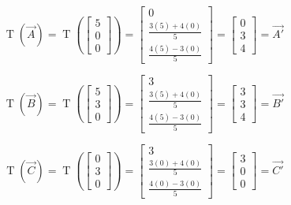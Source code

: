 \documentclass[12pt, letterpaper]{article}
\theoremstyle{statement}
\theoremstyle{statement}
\begin{document}
    $$
    \operatorname{T}(\Vec{A})
    =\operatorname{T}\left(\begin{bmatrix}
                        5\\ 0\\ 0
                        \end{bmatrix}\right)
    =\begin{bmatrix}
    0\\
    \frac{3(5)+4(0)}{5}\\
    \frac{4(5)-3(0)}{5}
    \end{bmatrix}
    =\begin{bmatrix}
    0\\
    3\\
    4
    \end{bmatrix}
    =\Vec{A'}
    $$
    
    $$
    \operatorname{T}(\Vec{B})
    =\operatorname{T}\left(\begin{bmatrix}
                        5 \\3 \\0
                        \end{bmatrix}\right)
    =\begin{bmatrix}
    3\\
    \frac{3(5)+4(0)}{5}\\
    \frac{4(5)-3(0)}{5}
    \end{bmatrix}
    =\begin{bmatrix}
    3\\
    3\\
    4
    \end{bmatrix}
    =\Vec{B'}
    $$
    
    $$
    \operatorname{T}(\Vec{C})
    =\operatorname{T}\left(\begin{bmatrix}
                        0\\ 3 \\0
                        \end{bmatrix}\right)
    =\begin{bmatrix}
    3\\
    \frac{3(0)+4(0)}{5}\\
    \frac{4(0)-3(0)}{5}
    \end{bmatrix}
    =\begin{bmatrix}
    3\\
    0\\
    0
    \end{bmatrix}
    =\Vec{C'}
    $$
    
\end{document}
